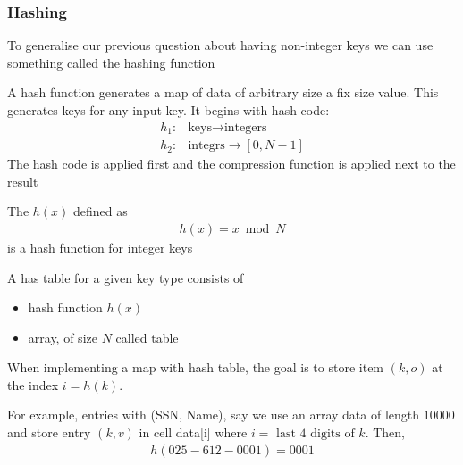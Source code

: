 \documentclass[a4paper]{article}
\theoremstyle{plain}
\theoremstyle{definition}
\newtheorem{defn}{Definition}[section]
\newtheorem{exmp}{Example}[section]
\theoremstyle{remark}
\begin{document}
\subsubsection{Hashing}
To generalise our previous question about having non-integer keys we can use something called the hashing function
\begin{tcolorbox}[colback=black!3!white,colframe=black!60!white,title=\begin{defn}Hashing Function \label{Hashing Function}\end{defn}]
A hash function generates a map of data of arbitrary size a fix size value. This generates keys for any input key. It begins with hash code:
\begin{align*}
	h_1:& \text{keys} \to \text{integers} \\
	h_2:&\text{integrs}\to [0,N-1]
\end{align*}
The hash code is applied first and the compression function is applied next to the result 
\end{tcolorbox}
\begin{tcolorbox}[colback=black!3!white,colframe=black!60!white,title=\begin{exmp}Hash Function Example \label{Hash Function Example}\end{exmp}]
        The $h(x)$ defined as
                \begin{align}
                h(x) = x   \bmod N  
                \end{align}
		is a hash function for integer keys
\end{tcolorbox}
\begin{tcolorbox}[colback=black!3!white,colframe=black!60!white,title=\begin{defn}Hash Table \label{Hash Table}\end{defn}]
A has table for a given key type consists of 
\begin{itemize}
	\item hash function $h(x)$
	\item array, of size $N$ called table
\end{itemize}
When implementing a map with hash table, the goal is to store item $(k,o)$ at the index $i = h(k)$.
\end{tcolorbox}
For example, entries with (SSN, Name), say we use an array data of length $10000$ and store entry $(k,v)$ in cell data[i] where $i = \text{ last } 4 \text{ digits of }k$. Then,
\begin{align*}
	h(025-612-0001)=0001
\end{align*}
\end{document}
